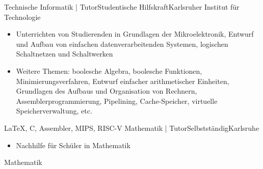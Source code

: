 {    \begin{experiences}
        \experience
        {
        }   {Technische Informatik | Tutor}{Studentische Hilfskraft}{Karlsruher Institut für Technologie}
        {
        } {
        \begin{itemize}
            \item Unterrichten von Studierenden in Grundlagen der Mikroelektronik, Entwurf und Aufbau von einfachen datenverarbeitenden Systemen, logischen Schaltnetzen und Schaltwerken
            \item Weitere Themen: boolesche Algebra, boolesche Funktionen, Minimierungsverfahren, Entwurf einfacher arithmetischer Einheiten, Grundlagen des Aufbaus und Organisation von Rechnern, Assemblerprogrammierung, Pipelining, Cache-Speicher, virtuelle Speicherverwaltung, etc.      
        \end{itemize}
        }
        {\LaTeX, C, Assembler, MIPS, RISC-V}
        \emptySeparator
        \experience
        {
        }   {Mathematik | Tutor}{Selbstständig}{Karlsruhe}
        {
        } { %
        \begin{itemize}
            \item Nachhilfe für Schüler in Mathematik
        \end{itemize}
        }
        {Mathematik}
        
    \end{experiences}
}
  